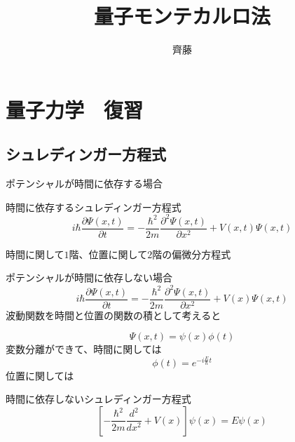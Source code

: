\documentclass[dvipdfmx]{beamer}
\title{量子モンテカルロ法}
\author{齊藤}
\begin{document}
\maketitle
\frame{\tableofcontents[hideallsubsections]}

\section{量子力学　復習}
\subsection{シュレディンガー方程式}

\begin{frame}
    ポテンシャルが時間に依存する場合
    \begin{block}{時間に依存するシュレディンガー方程式}
        \begin{equation}
            i\hbar\dfrac{\partial \Psi(x,t)}{\partial t} = -\dfrac{\hbar^2}{2m}\dfrac{\partial^2 \Psi(x,t)}{\partial x^2} + V(x,t)\Psi(x,t)
        \end{equation}
    \end{block}

    時間に関して$1$階、位置に関して$2$階の偏微分方程式
    \end{frame}

    \begin{frame}
    ポテンシャルが時間に依存しない場合
        \begin{equation}
            i\hbar\dfrac{\partial \Psi(x,t)}{\partial t} = -\dfrac{\hbar^2}{2m}\dfrac{\partial^2 \Psi(x,t)}{\partial x^2} + V(x)\Psi(x,t)
        \end{equation}
    波動関数を時間と位置の関数の積として考えると

        \begin{equation}
            \Psi(x,t) = \psi(x)\phi(t)
        \end{equation}
    変数分離ができて、時間に関しては
        \begin{equation}
            \phi(t) = e^{-i\frac{E}{\hbar}t}
        \end{equation}
    位置に関しては
    \begin{block}{時間に依存しないシュレディンガー方程式}
        \begin{equation}
            \left[-\dfrac{\hbar^2}{2m}\dfrac{d^2}{dx^2} + V(x)\right]\psi(x) = E\psi(x)
        \end{equation}
    \end{block}
    \end{frame}
\end{document}

